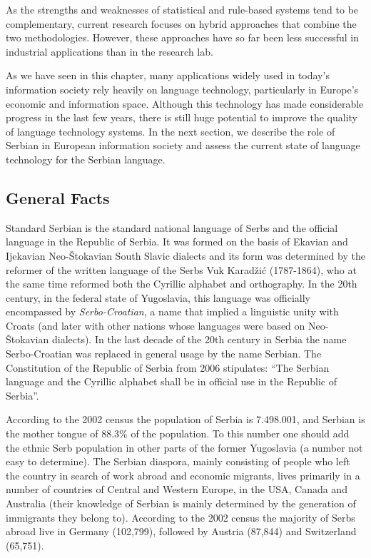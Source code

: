 {\begin{multicols}{2}
As the strengths and weaknesses of statistical and rule-based systems tend to be complementary, current research focuses on hybrid approaches that combine the two methodologies. However, these approaches have so far been less successful in industrial applications than in the research lab. 

As we have seen in this chapter, many applications widely used in today’s information society rely heavily on language technology, particularly in Europe’s economic and information space. Although this technology has made considerable progress in the last few years, there is still huge potential to improve the quality of language technology systems. In the next section, we describe the role of Serbian in European information society and assess the current state of language technology for the Serbian language. 

\end{multicols}

\clearpage


\begin{multicols}{2}

\subsection{General Facts}

Standard Serbian is the standard national language of Serbs and the official language in the Republic of Serbia. It was formed on the basis of Ekavian and Ijekavian Neo-Štokavian South Slavic dialects and its form was determined by the reformer of the written language of the Serbs Vuk Karadžić (1787-1864), who at the same time reformed both the Cyrillic alphabet and orthography. In the 20th century, in the federal state of Yugoslavia, this language was officially encompassed by \textit{Serbo-Croatian}, a name that implied a linguistic unity with Croats (and later with other nations whose languages were based on Neo-Štokavian dialects).  In the last decade of the 20th century in Serbia the name Serbo-Croatian was replaced in general usage by the name Serbian. The Constitution of the Republic of Serbia from 2006 stipulates: “The Serbian language and the Cyrillic alphabet shall be in official use in the Republic of Serbia”. \cite{Ustav}

According to the 2002 census the population of Serbia is 7.498.001, \cite{VJN3} and Serbian is the mother tongue of 88.3\% of the population. \cite{HDR} To this number one should add the ethnic Serb population in other parts of the former Yugoslavia (a number not easy to determine). The Serbian diaspora, mainly consisting of people who left the country in search of work abroad and economic migrants, lives primarily in a number of countries of Central and Western Europe, in the USA, Canada and Australia (their knowledge of Serbian is mainly determined by the generation of immigrants they belong to).  According to the 2002 census the majority of Serbs abroad live in Germany (102,799), followed by Austria (87,844) and Switzerland (65,751).


\end{multicols}}

